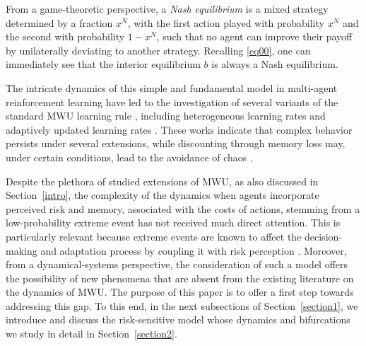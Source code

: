\documentclass{article}
\theoremstyle{plain}
\theoremstyle{definition}
\begin{document}
From a game-theoretic perspective, a \emph{Nash equilibrium} is a mixed strategy determined by a fraction $x^N$, with the first action played with probability $x^N$ and the second with probability $1-x^N$, such that no agent can improve their payoff by unilaterally deviating to another strategy. Recalling \eqref{eq00}, one can immediately see that the interior equilibrium $b$ is always a Nash equilibrium.

The intricate dynamics of this simple and fundamental model in multi-agent reinforcement learning have led to the investigation of several variants of the standard MWU learning rule \cite{bielawski2,palaiopanos,chotibut2,bielawski,vlatakis1,bielawski3}, including heterogeneous learning rates \cite{bielawski2,hadhikanloo} and adaptively updated learning rates \cite{vlatakis1}. These works indicate that complex behavior persists under several extensions, while discounting through memory loss may, under certain conditions, lead to the avoidance of chaos \cite{bielawski3}.

Despite the plethora of studied extensions of MWU, as also discussed in Section~\ref{intro}, the complexity of the dynamics when agents incorporate perceived risk and memory, associated with the costs of actions, stemming from a low-probability extreme event has not received much direct attention. This is particularly relevant because extreme events are known to affect the decision-making and adaptation process by coupling it with risk perception \cite{camerer,plonsky,hertwig,camerer2}. Moreover, from a dynamical-systems perspective, the consideration of such a model offers the possibility of new phenomena that are absent from the existing literature on the dynamics of MWU. The purpose of this paper is to offer a first step towards addressing this gap. To this end, in the next subsections of Section~\ref{section1}, we introduce and discuss the risk-sensitive model whose dynamics and bifurcations we study in detail in Section~\ref{section2}.
\end{document}
